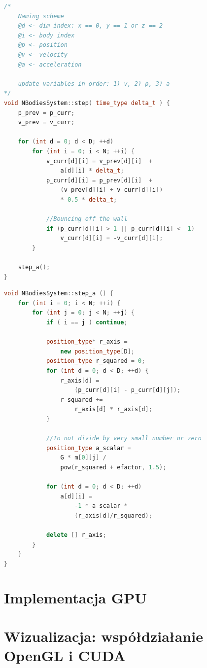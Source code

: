 \documentclass[fleqn]{article}
\begin{document}
\begin{minipage}{\linewidth}
\begin {lstlisting}[language=C++]
/*
    Naming scheme
    @d <- dim index: x == 0, y == 1 or z == 2
    @i <- body index
    @p <- position
    @v <- velocity
    @a <- acceleration

    update variables in order: 1) v, 2) p, 3) a
*/
void NBodiesSystem::step( time_type delta_t ) {
    p_prev = p_curr;
    v_prev = v_curr;

    for (int d = 0; d < D; ++d)
        for (int i = 0; i < N; ++i) {
            v_curr[d][i] = v_prev[d][i]  +  
                a[d][i] * delta_t;
            p_curr[d][i] = p_prev[d][i]  +  
                (v_prev[d][i] + v_curr[d][i]) 
                * 0.5 * delta_t;

            //Bouncing off the wall
            if (p_curr[d][i] > 1 || p_curr[d][i] < -1) 
                v_curr[d][i] = -v_curr[d][i];
        }

    step_a();
} 
\end{lstlisting}
\end{minipage}


\begin{minipage}{\linewidth}
\begin {lstlisting}[language=C++]
void NBodiesSystem::step_a () {
    for (int i = 0; i < N; ++i) {
        for (int j = 0; j < N; ++j) {
            if ( i == j ) continue;

            position_type* r_axis = 
                new position_type[D];
            position_type r_squared = 0;
            for (int d = 0; d < D; ++d) {
                r_axis[d] = 
                    (p_curr[d][i] - p_curr[d][j]);
                r_squared += 
                    r_axis[d] * r_axis[d];
            }

            //To not divide by very small number or zero
            position_type a_scalar = 
                G * m[0][j] / 
                pow(r_squared + efactor, 1.5);

            for (int d = 0; d < D; ++d)
                a[d][i] = 
                    -1 * a_scalar * 
                    (r_axis[d]/r_squared);

            delete [] r_axis;
        }
    }
}
\end{lstlisting}
\end{minipage}

\section{Implementacja GPU}


\section{Wizualizacja: współdziałanie OpenGL i CUDA}
\end{document}
